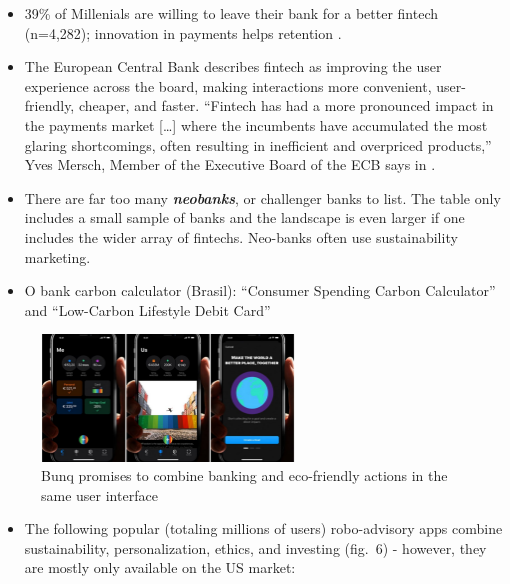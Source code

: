 \documentclass[
  letterpaper,
  DIV=11,
  numbers=noendperiod]{scrartcl}
\providecommand{\tightlist}{%
  \setlength{\itemsep}{0pt}\setlength{\parskip}{0pt}}\usepackage{longtable,booktabs,array}
\begin{document}
\begin{itemize}
\item
  39\% of Millenials are willing to leave their bank for a better
  fintech (n=4,282); innovation in payments helps retention
  \citep{pymntsStayingAheadPayments2023}.
\item
  The European Central Bank describes fintech as improving the user
  experience across the board, making interactions more convenient,
  user-friendly, cheaper, and faster. ``Fintech has had a more
  pronounced impact in the payments market {[}\ldots{]} where the
  incumbents have accumulated the most glaring shortcomings, often
  resulting in inefficient and overpriced products,'' Yves Mersch,
  Member of the Executive Board of the ECB says in
  \citet{europeancentralbankLendingPaymentSystems2019}.
\item
  There are far too many \textbf{\emph{neobanks}}, or challenger banks
  to list. The table only includes a small sample of banks and the
  landscape is even larger if one includes the wider array of fintechs.
  Neo-banks often use sustainability marketing.
\item
  O bank carbon calculator (Brasil): ``Consumer Spending Carbon
  Calculator'' and ``Low-Carbon Lifestyle Debit Card''
\end{itemize}

\begin{figure}[H]

{\centering \includegraphics[width=0.6\textwidth,height=\textheight]{./images/bunq.jpg}

}

\caption{Bunq promises to combine banking and eco-friendly actions in
the same user interface}

\end{figure}%

\begin{itemize}
\tightlist
\item
  The following popular (totaling millions of users) robo-advisory apps
  combine sustainability, personalization, ethics, and investing
  (fig.~6) - however, they are mostly only available on the US market:
\end{itemize}
\end{document}
